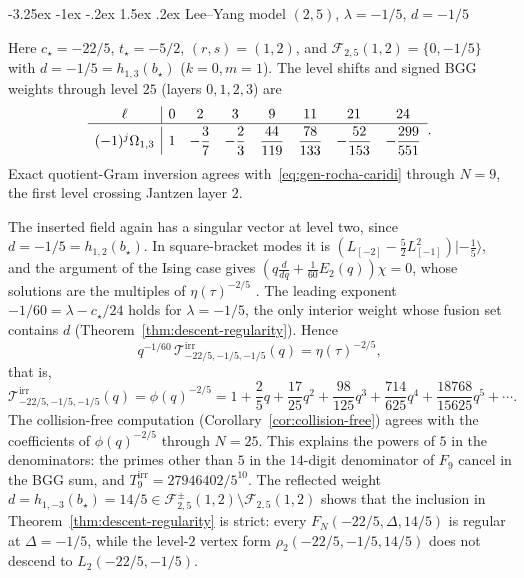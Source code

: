 \documentclass[twoside,10pt]{article}
\makeatletter
\numberwithin{equation}{section}
\theoremstyle{slbody}
\theoremstyle{definition}
\theoremstyle{remark}
\renewcommand{\subsection}{%
  \@startsection{subsection}{2}{\z@}%
    {-3.25ex \@plus -1ex \@minus -.2ex}%
    {1.5ex \@plus .2ex}%
    {\normalfont\normalsize\bfseries}}
\makeatother
\begin{document}
\subsection{Lee--Yang model \texorpdfstring{\((2,5)\), \(\lambda=-1/5\), \(d=-1/5\)}{(2,5), lambda=-1/5, d=-1/5}}

Here \(c_\star=-22/5\), \(t_\star=-5/2\), \((r,s)=(1,2)\), and
\(\mathcal{F}_{2,5}(1,2)=\{0,-1/5\}\) with \(d=-1/5=h_{1,3}(b_\star)\)
(\(k=0,m=1\)).  The level shifts and signed BGG weights through
level \(25\) (layers
\(0,1,2,3\)) are
\[
 \begin{array}{c|ccccccc}
  \ell & 0 & 2 & 3 & 9 & 11 & 21 & 24 \\\hline\noalign{\vskip2pt}
  (-1)^j\Omega_{1,3} & 1 & -\dfrac{3}{7} & -\dfrac{2}{3} & \dfrac{44}{119} & \dfrac{78}{133} & -\dfrac{52}{153} & -\dfrac{299}{551}
 \end{array}.
\]
Exact quotient-Gram inversion agrees with~\eqref{eq:gen-rocha-caridi} through
\(N=9\), the first level crossing Jantzen layer \(2\).

The inserted field again has a singular vector at level two, since
\(d=-1/5=h_{1,2}(b_\star)\).  In square-bracket modes it is
\((L_{[-2]}-\tfrac52L_{[-1]}^2)\lvert-\tfrac15\rangle\), and the argument of the
Ising case gives \((q\frac{d}{dq}+\frac1{60}E_2(q))\chi=0\), whose solutions
are the multiples of \(\eta(\tau)^{-2/5}\)
\cite[\S3.1.1, (3.3)--(3.9)]{GaberdielLang2009}.  The leading exponent
\(-1/60=\lambda-c_\star/24\) holds for \(\lambda=-1/5\), the only interior
weight whose fusion set contains \(d\) (Theorem~\ref{thm:descent-regularity}).
Hence
\[
 q^{-1/60}\,\mathcal{T}^{\mathrm{irr}}_{-22/5,-1/5,-1/5}(q)=\eta(\tau)^{-2/5},
\]
that is,
\[
 \mathcal{T}^{\mathrm{irr}}_{-22/5,-1/5,-1/5}(q)=\phi(q)^{-2/5}
 =1+\frac{2}{5}q+\frac{17}{25}q^2+\frac{98}{125}q^3+\frac{714}{625}q^4
 +\frac{18768}{15625}q^5+\cdots.
\]
The collision-free computation (Corollary~\ref{cor:collision-free}) agrees
with the coefficients of \(\phi(q)^{-2/5}\) through \(N=25\).  This explains
the powers of \(5\) in the denominators: the primes other than \(5\) in the
\(14\)-digit denominator of \(F_9\) cancel in the BGG sum, and
\(T^{\mathrm{irr}}_9=27946402/5^{10}\).
The reflected weight
\(d=h_{1,-3}(b_\star)=14/5\in\mathcal{F}^\pm_{2,5}(1,2)\setminus\mathcal{F}_{2,5}(1,2)\)
shows that the inclusion in Theorem~\ref{thm:descent-regularity} is strict:
every \(F_N(-22/5,\Delta,14/5)\) is regular at \(\Delta=-1/5\), while the
level-\(2\) vertex form
\(\rho_2(-22/5,-1/5,14/5)\) does not descend to \(L_2(-22/5,-1/5)\).
\end{document}
